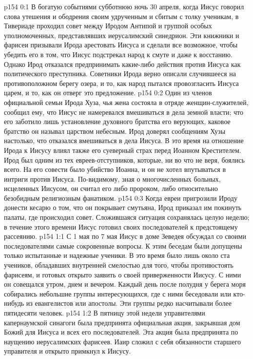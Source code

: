 \vs p154 0:1 В богатую событиями субботнюю ночь 30 апреля, когда Иисус говорил слова утешения и ободрения своим удрученным и сбитым с толку ученикам, в Тивериаде проходил совет между Иродом Антипой и группой особых уполномоченных, представлявших иерусалимский синедрион. Эти книжники и фарисеи призывали Ирода арестовать Иисуса и сделали все возможное, чтобы убедить его в том, что Иисус подстрекал народ к смуте и даже к восстанию. Однако Ирод отказался предпринимать какие\hyp{}либо действия против Иисуса как политического преступника. Советники Ирода верно описали случившееся на противоположном берегу озера, и то, как народ пытался провозгласить Иисуса царем, и то, как он отверг это предложение.
\vs p154 0:2 Один из членов официальной семьи Ирода Хуза, чья жена состояла в отряде женщин\hyp{}служителей, сообщил ему, что Иисус не намеревался вмешиваться в дела земной власти; что его заботило лишь установление духовного братства его верующих, каковое братство он называл царством небесным. Ирод доверял сообщениям Хузы настолько, что отказался вмешиваться в дела Иисуса. В это время на отношение Ирода к Иисусу влиял также его суеверный страх перед Иоанном Крестителем. Ирод был одним из тех евреев\hyp{}отступников, которые, ни во что не веря, боялись всего. На его совести было убийство Иоанна, и он не хотел впутываться в интриги против Иисуса. По\hyp{}видимому, зная о многочисленных больных, исцеленных Иисусом, он считал его либо пророком, либо относительно безобидным религиозным фанатиком.
\vs p154 0:3 Когда евреи пригрозили Ироду донести кесарю о том, что он покрывает смутьяна, Ирод приказал им покинуть палаты, где происходил совет. Сложившаяся ситуация сохранялась целую неделю; в течение этого времени Иисус готовил своих последователей к предстоящему рассеянию.
\vs p154 1:1 С 1 мая по 7 мая Иисус в доме Зеведея обсуждал со своими последователями самые сокровенные вопросы. К этим беседам были допущены только испытанные и надежные ученики. В это время было лишь около ста учеников, обладавших внутренней смелостью для того, чтобы противостоять фарисеям, и готовых открыто заявить о своей приверженности Иисусу. С ними он совещался утром, днем и вечером. Каждый день после полудня у берега моря собирались небольшие группы интересующихся, где с ними беседовали или кто\hyp{}нибудь из евангелистов или апостолы. Эти группы редко насчитывали более пятидесяти человек.
\vs p154 1:2 В пятницу этой недели управителями капернаумской синагоги была предпринята официальная акция, закрывшая дом Божий для Иисуса и всех его последователей. Эта акция была предпринята по наущению иерусалимских фарисеев. Иаир сложил с себя обязанности старшего управителя и открыто примкнул к Иисусу.
